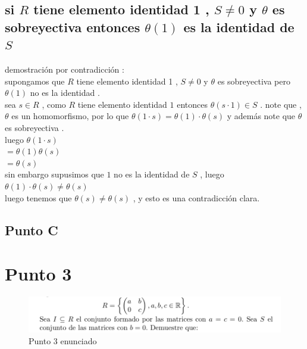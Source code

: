 \documentclass[10pt,a4paper]{article} %
\begin{document}
        \subsection{ si $ R  $ tiene elemento identidad 1 , $ S \not= 0  $
            y $   \theta $ es sobreyectiva entonces $ \theta (1)  $  es la identidad
            de $ S  $  }

            demostración por contradicción :
            \\
            supongamos que $ R  $ tiene elemento identidad 1 , $ S \not= 0
            $  y $ \theta   $ es sobreyectiva pero $ \theta (1)  $ no es la
            identidad .
            \\
            sea $ s \in R  $ , como $ R  $ tiene elemento identidad $ 1  $
            entonces $ \theta (s \cdot 1)  \in S $  . note que , $ \theta   $
            es un homomorfismo, por lo que  $ \theta (1 \cdot s) = \theta
            (1) \cdot \theta (s)  $ y además note que $ \theta  $ es sobreyectiva .
            \\
            luego $ \theta (1 \cdot s)  $
            \\
            $ = \theta (1) \theta (s)  $
            \\
            $ = \theta (s)  $
            \\
            sin embargo supusimos que $ 1  $ no es la identidad de $ S  $ , luego
            \\
            $ \theta(1) \cdot \theta(s) \not= \theta(s)  $
            \\
            luego tenemos que $ \theta (s) \not= \theta (s)  $  , y esto es
            una contradicción clara.

        \subsection{Punto C}


    \section{Punto 3}
        \begin{figure}[h!]
            \centering
            \includegraphics[width=0.8\linewidth]{punto2.png}
            \caption{Punto 3 enunciado}
            \label{fig}
        \end{figure}
\end{document}

